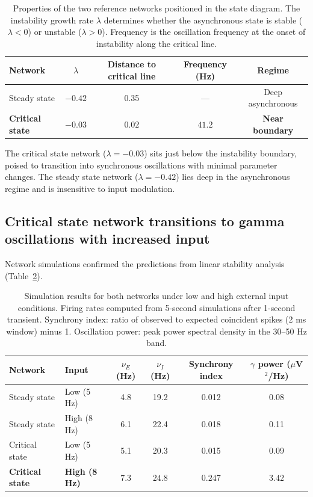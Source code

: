 \documentclass[11pt]{article}
\begin{document}
\begin{table}[H]
\centering
\caption{Properties of the two reference networks positioned in the state diagram. The instability growth rate $\lambda$ determines whether the asynchronous state is stable ($\lambda < 0$) or unstable ($\lambda > 0$). Frequency is the oscillation frequency at the onset of instability along the critical line.}
\label{tab:statediagram}
\begin{tabular}{lcccc}
\toprule
\textbf{Network} & \textbf{$\lambda$} & \textbf{Distance to critical line} & \textbf{Frequency (Hz)} & \textbf{Regime} \\
\midrule
Steady state & $-0.42$ & 0.35 & --- & Deep asynchronous \\
\textbf{Critical state} & $\mathbf{-0.03}$ & $\mathbf{0.02}$ & $\mathbf{41.2}$ & \textbf{Near boundary} \\
\bottomrule
\end{tabular}
\end{table}

The critical state network ($\lambda = -0.03$) sits just below the instability boundary, poised to transition into synchronous oscillations with minimal parameter changes. The steady state network ($\lambda = -0.42$) lies deep in the asynchronous regime and is insensitive to input modulation.

\subsection{Critical state network transitions to gamma oscillations with increased input}

Network simulations confirmed the predictions from linear stability analysis (Table~\ref{tab:simulation}).

\begin{table}[H]
\centering
\caption{Simulation results for both networks under low and high external input conditions. Firing rates computed from 5-second simulations after 1-second transient. Synchrony index: ratio of observed to expected coincident spikes (2 ms window) minus 1. Oscillation power: peak power spectral density in the 30--50 Hz band.}
\label{tab:simulation}
\begin{tabular}{llcccc}
\toprule
\textbf{Network} & \textbf{Input} & \textbf{$\nu_E$ (Hz)} & \textbf{$\nu_I$ (Hz)} & \textbf{Synchrony index} & \textbf{$\gamma$ power ($\mu$V$^2$/Hz)} \\
\midrule
Steady state & Low (5 Hz) & 4.8 & 19.2 & 0.012 & 0.08 \\
Steady state & High (8 Hz) & 6.1 & 22.4 & 0.018 & 0.11 \\
Critical state & Low (5 Hz) & 5.1 & 20.3 & 0.015 & 0.09 \\
\textbf{Critical state} & \textbf{High (8 Hz)} & $\mathbf{7.3}$ & $\mathbf{24.8}$ & $\mathbf{0.247}$ & $\mathbf{3.42}$ \\
\bottomrule
\end{tabular}
\end{table}
\end{document}

